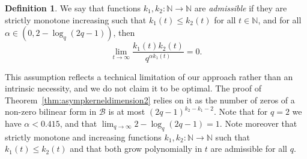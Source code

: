 \documentclass[a4paper,11pt,reqno]{article}
\theoremstyle{plain} \numberwithin{equation}{section}
\theoremstyle{definition}
\newtheorem{definition}[theorem]{Definition}
\begin{document}
\begin{definition}
    We say that functions $k_1,k_2\colon \mathbb{N}\rightarrow \mathbb{N}$ are \emph{admissible} if they are strictly monotone increasing such that $k_1(t)\leq k_2(t)$ for all $t\in \mathbb{N}$, and for all $\alpha \in (0,2-\log_q(2q-1))$, then
    $$\lim_{t\rightarrow \infty} \frac{k_1(t)k_2(t)}{q^{\alpha k_1(t)}} = 0.$$
\end{definition}

This assumption reflects a technical limitation of our approach rather than an intrinsic necessity, and we do not claim it to be optimal. The proof of Theorem~\ref{thm:asympkerneldimension2} relies on it as the number of zeros of a non-zero bilinear form in $\mathcal{B}$ is at most $(2q-1)^{k_2-k_1 - 2}$. Note that for $q=2$ we have $\alpha < 0.415$, and that $\lim_{q\rightarrow \infty} 2-\log_q(2q-1) = 1.$ Note moreover that 
strictly monotone and increasing functions $k_1,k_2\colon \mathbb{N}\rightarrow \mathbb{N}$ such that $k_1(t)\le k_2(t)$ and that both grow polynomially in $t$ are admissible for all $q$.
\end{document}
